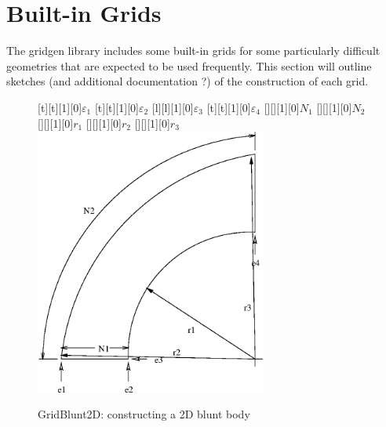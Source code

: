 \section{Built-in Grids}

The gridgen library includes some built-in grids
for some particularly difficult geometries that are
expected to be used frequently. 
This section will outline sketches (and
additional documentation ?) of the construction of each grid.


%
\begin{figure}[h]
\vspace{0.3cm}
   \fontxfig
   [t][t][1][0]{$\varepsilon_1$}
   [t][t][1][0]{$\varepsilon_2$}
   [l][l][1][0]{$\varepsilon_3$}
   [t][t][1][0]{$\varepsilon_4$}
   [][][1][0]{$N_1$}
   [][][1][0]{$N_2$}
   [][][1][0]{$r_1$}
   [][][1][0]{$r_2$}
   [][][1][0]{$r_3$}
   \includegraphics[width=3.0in]{gridBlunt2D.eps}
\caption{GridBlunt2D: constructing a 2D blunt body}
\label{fig:gridBlunt2D}
\end{figure}
%


